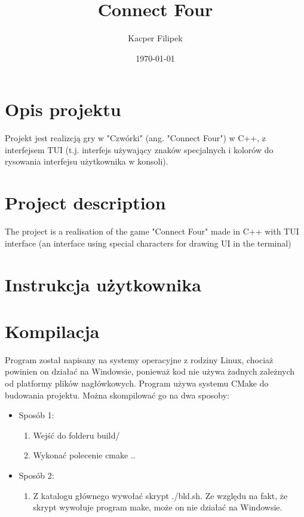 \documentclass{article}
\title{Connect Four}
\author{Kacper Filipek}
\date{\today}
\begin{document}
\maketitle

\section{Opis projektu}

Projekt jest realizcją gry w "Czwórki" (ang. "Connect Four") w C++, z interfejsem TUI (t.j. interfejs używający znaków specjalnych i kolorów do rysowania interfejsu użytkownika w konsoli).


\section{Project description}

The project is a realisation of the game "Connect Four" made in C++ with TUI interface (an interface using special characters for drawing UI in the terminal)

\section{Instrukcja użytkownika}

\section{Kompilacja}

Program został napisany na systemy operacyjne z rodziny Linux, 
chociaż powinien on działać na Windowsie, ponieważ kod nie 
używa żadnych zależnych od platformy plików nagłówkowych. 
Program używa  systemu CMake do budowania projektu. 
Można skompilować go na dwa sposoby:
    \begin{itemize}
         
    \item Sposób 1:
        \begin{enumerate}
            \item Wejść do folderu build/
            \item Wykonać polecenie cmake ..
        \end{enumerate}

    \item Sposób 2:
        \begin{enumerate}
            \item Z katalogu głównego wywołać skrypt ./bld.sh. Ze względu na fakt, że skrypt wywołuje program make, może on nie działać na Windowsie.
        \end{enumerate}

    \end{itemize}
\end{document}
